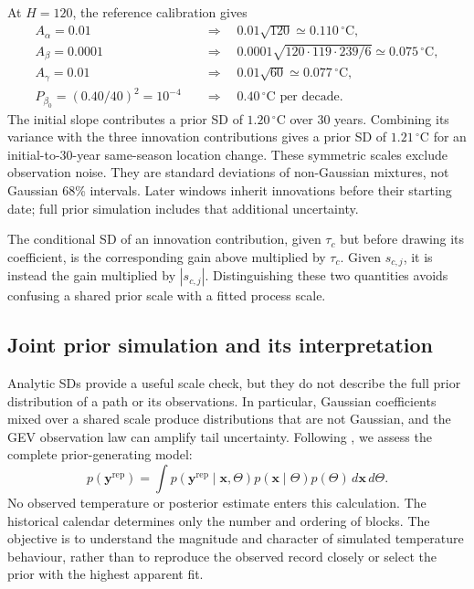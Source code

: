 \documentclass[11pt,a4paper]{article}
\newcommand{\Cdeg}{\,^\circ\mathrm{C}}
\begin{document}
At \(H=120\), the reference calibration gives
\begin{equation}\label{eq:supp-shrinkage-scales}
\begin{aligned}
A_\alpha=0.01
 &\quad\Longrightarrow\quad0.01\sqrt{120}\simeq0.110\Cdeg,\\
A_\beta=0.0001
 &\quad\Longrightarrow\quad
 0.0001\sqrt{120\cdot119\cdot239/6}\simeq0.075\Cdeg,\\
A_\gamma=0.01
 &\quad\Longrightarrow\quad0.01\sqrt{60}\simeq0.077\Cdeg,\\
P_{\beta_0}=(0.40/40)^2=10^{-4}
 &\quad\Longrightarrow\quad0.40\Cdeg\text{ per decade}.
\end{aligned}
\end{equation}
The initial slope contributes a prior SD of \(1.20\Cdeg\) over 30 years.
Combining its variance with the three innovation contributions gives a
prior SD of \(1.21\Cdeg\) for an initial-to-30-year same-season
location change. These symmetric scales exclude observation noise.
They are standard deviations of non-Gaussian mixtures, not Gaussian
68\% intervals. Later windows inherit innovations before their starting
date; full prior simulation includes that additional uncertainty.

The conditional SD of an innovation contribution, given \(\tau_c\)
but before drawing its coefficient, is the corresponding gain above
multiplied by \(\tau_c\). Given \(s_{c,j}\), it is instead the gain
multiplied by \(|s_{c,j}|\). Distinguishing these two quantities avoids
confusing a shared prior scale with a fitted process scale.

\subsection{Joint prior simulation and its interpretation}
\label{supp:prior-simulation}

Analytic SDs provide a useful scale check, but they do not describe the full
prior distribution of a path or its observations. In particular, Gaussian
coefficients mixed over a shared scale produce distributions that are not
Gaussian, and the GEV observation law can amplify tail uncertainty. Following
\citet[Section~3]{gabry2019}, we assess the complete prior-generating model:
\begin{equation}\label{eq:supp-prior-predictive}
p(\bm y^{\mathrm{rep}})
=\int p(\bm y^{\mathrm{rep}}\mid\bm x,\Theta)
       p(\bm x\mid\Theta)p(\Theta)\,d\bm x\,d\Theta.
\end{equation}
No observed temperature or posterior estimate enters this calculation.
The historical calendar determines only the number and ordering of blocks.
The objective is to understand the magnitude and character of simulated
temperature behaviour, rather than to reproduce the observed record closely
or select the prior with the highest apparent fit.
\end{document}
